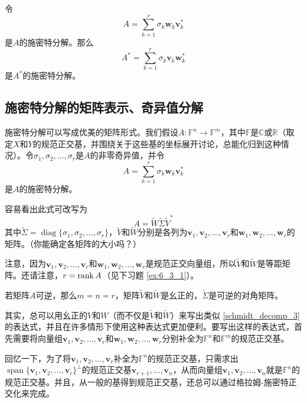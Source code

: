 \begin{corollary}
    令\[A=\sum_{k=1}^r\sigma_k\mathbf{w}_k\mathbf{v}_k^*\]是$A$的施密特分解。那么\[A^*=\sum_{k=1}^r\sigma_k\mathbf{v}_k\mathbf{w}_k^*\]是$A^*$的施密特分解。
\end{corollary}

\subsection{施密特分解的矩阵表示、奇异值分解}

施密特分解可以写成优美的矩阵形式。我们假设$A:\mathbb{F}^n\to \mathbb{F}^m$，其中$\mathbb{F}$是$\mathbb{C}$或$\mathbb{R}$（取定$X$和$Y$的规范正交基，并围绕关于这些基的坐标展开讨论，总能化归到这种情况）。令$\sigma_{1},\sigma_{2},\ldots,\sigma_{r}$是$A$的非零奇异值，并令
\[A=\sum_{k=1}^r\sigma_k\mathbf{w}_k\mathbf{v}_k^*\]
是$A$的施密特分解。

容易看出此式可改写为
\begin{equation}\label{schmidt_decomp_3}
    A=\widetilde{W}\widetilde{\Sigma}\widetilde{V}^*
\end{equation}
其中$\widetilde{\Sigma}=\operatorname{diag}\{\sigma_1,\sigma_2,\dots,\sigma_r\}$，$\widetilde{V}$和$\widetilde{W}$分别是各列为$\mathbf{v}_{1},\mathbf{v}_{2},\ldots,\mathbf{v}_{r}$和$\mathbf{w}_{1},\mathbf{w}_{2},\ldots,\mathbf{w}_{r}$的矩阵。（你能确定各矩阵的大小吗？）

注意，因为$\mathbf{v}_{1},\mathbf{v}_{2},\ldots,\mathbf{v}_{r}$和$\mathbf{w}_{1},\mathbf{w}_{2},\ldots,\mathbf{w}_{r}$是规范正交向量组，所以$\widetilde{V}$和$\widetilde{W}$是等距矩阵。还请注意，$r=\operatorname{rank} A$（见下习题 \ref{ex:6_3_1}）。

若矩阵$A$可逆，那么$m=n=r$，矩阵$\widetilde{V}$和$\widetilde{W}$是幺正的，$\widetilde{\Sigma}$是可逆的对角矩阵。

其实，总可以用幺正的$V$和$W$（而不仅是$\widetilde{V}$和$\widetilde{W}$）来写出类似 \eqref{schmidt_decomp_3} 的表达式，并且在许多情形下使用这种表达式更加便利。要写出这样的表达式，首先需要将向量组$\mathbf{v}_{1},\mathbf{v}_{2},\ldots,\mathbf{v}_{r}$和$\mathbf{w}_{1},\mathbf{w}_{2},\ldots,\mathbf{w}_{r}$分别补全为$\mathbb{F}^n$和$\mathbb{F}^m$的规范正交基。

回忆一下，为了将$\mathbf{v}_{1},\mathbf{v}_{2},\ldots,\mathbf{v}_{r}$补全为$\mathbb{F}^n$的规范正交基，只需求出$\operatorname{span}\{\mathbf{v}_{1},\mathbf{v}_{2},\ldots,\mathbf{v}_{r}\}^\perp$的规范正交基$\mathbf{v}_{r+1},\ldots,\mathbf{v}_{n}$，从而向量组\linebreak$\mathbf{v}_{1},\mathbf{v}_{2},\ldots,\mathbf{v}_{n}$就是$\mathbb{F}^n$的规范正交基。并且，从一般的基得到规范正交基，还总可以通过格拉姆-施密特正交化来完成。

